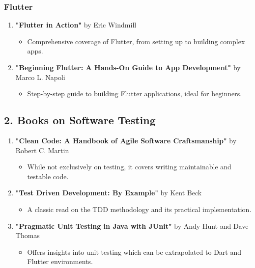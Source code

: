 \subsubsection*{Flutter}
\begin{enumerate}
 \item \textbf{"Flutter in Action"} by Eric Windmill
 \begin{itemize}
  \item Comprehensive coverage of Flutter, from setting up to building complex apps.
 \end{itemize}

 \item \textbf{"Beginning Flutter: A Hands-On Guide to App Development"} by Marco L. Napoli
 \begin{itemize}
  \item Step-by-step guide to building Flutter applications, ideal for beginners.
 \end{itemize}
\end{enumerate}

\subsection*{2. Books on Software Testing}

\begin{enumerate}
 \item \textbf{"Clean Code: A Handbook of Agile Software Craftsmanship"} by Robert C. Martin
 \begin{itemize}
  \item While not exclusively on testing, it covers writing maintainable and testable code.
 \end{itemize}

 \item \textbf{"Test Driven Development: By Example"} by Kent Beck
 \begin{itemize}
  \item A classic read on the TDD methodology and its practical implementation.
 \end{itemize}
 \item \textbf{"Pragmatic Unit Testing in Java with JUnit"} by Andy Hunt and Dave Thomas
 \begin{itemize}
  \item Offers insights into unit testing which can be extrapolated to Dart and Flutter environments.
 \end{itemize}
\end{enumerate}

